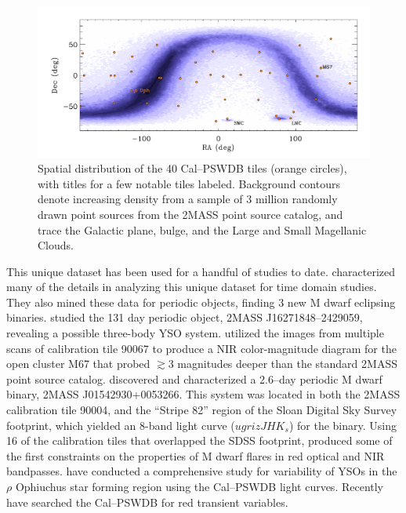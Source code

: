 \documentclass[]{emulateapj}
\begin{document}
\begin{figure}[!t]
\centering
\includegraphics[width=7.0in]{new_plots/radec_psc}
\caption{Spatial distribution of the 40 Cal--PSWDB tiles (orange circles), with titles for a few notable tiles labeled. Background contours denote increasing density from a sample of 3 million randomly drawn point sources from the 2MASS point source catalog, and trace the Galactic plane, bulge, and the Large and Small Magellanic Clouds.}
\label{radec}
\end{figure}



This unique dataset has been used for a handful of studies to date. 
\citet{plavchan2008a} characterized many of the details in analyzing this unique dataset for time domain studies. They also mined these data for periodic objects, finding 3 new M dwarf eclipsing binaries. 
\citet{plavchan2008b} studied the 131 day periodic object, 2MASS J16271848--2429059, revealing a possible three-body YSO system. 
\citet{sarajedini2009} utilized the images from multiple scans of calibration tile 90067 to produce a NIR color-magnitude diagram for the open cluster M67 that probed $\gtrsim$3 magnitudes deeper than the standard 2MASS point source catalog. 
\citet{becker2008} discovered and characterized a 2.6--day periodic M dwarf binary, 2MASS J01542930+0053266. This system was located in both the 2MASS calibration tile 90004, and the ``Stripe 82'' region of the Sloan Digital Sky Survey footprint, which yielded an 8-band light curve ($ugrizJHK_s$) for the binary. 
Using 16 of the calibration tiles that overlapped the SDSS footprint, \citet{davenport2012} produced some of the first constraints on the properties of M dwarf flares in red optical and NIR bandpasses. 
\citet{parks2013} have conducted a comprehensive study for variability of YSOs in the $\rho$ Ophiuchus star forming region using the Cal--PSWDB light curves. 
Recently \citet{quillen2014} have searched the Cal--PSWDB for red transient variables.
\end{document}
